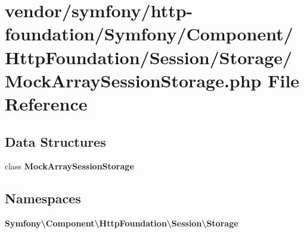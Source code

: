 \section{vendor/symfony/http-\/foundation/\+Symfony/\+Component/\+Http\+Foundation/\+Session/\+Storage/\+Mock\+Array\+Session\+Storage.php File Reference}
\label{_mock_array_session_storage_8php}
\subsection*{Data Structures}
\begin{DoxyCompactItemize}
\item 
class {\bf Mock\+Array\+Session\+Storage}
\end{DoxyCompactItemize}
\subsection*{Namespaces}
\begin{DoxyCompactItemize}
\item 
 {\bf Symfony\textbackslash{}\+Component\textbackslash{}\+Http\+Foundation\textbackslash{}\+Session\textbackslash{}\+Storage}
\end{DoxyCompactItemize}
